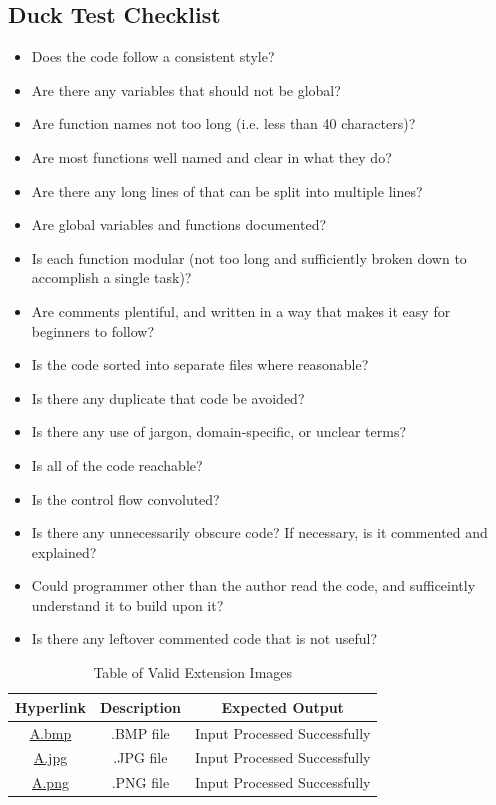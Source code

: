 \documentclass[12pt, titlepage]{article}
\begin{document}
\subsection{Duck Test Checklist} \label{checklist_duckTest}

\begin{itemize}
  \item{Does the code follow a consistent style?}
  \item{Are there any variables that should not be global?}
  \item{Are function names not too long (i.e. less than 40 characters)?}
  \item{Are most functions well named and clear in what they do?}
  \item{Are there any long lines of that can be split into multiple lines?}
  \item{Are global variables and functions documented?}
  \item{Is each function modular (not too long and sufficiently broken down to accomplish a single task)?}
  \item{Are comments plentiful, and written in a way that makes it easy for beginners to follow?}
  \item{Is the code sorted into separate files where reasonable?}
  \item{Is there any duplicate that code be avoided?}
  \item{Is there any use of jargon, domain-specific, or unclear terms?}
  \item{Is all of the code reachable?}
  \item{Is the control flow convoluted?}
  \item{Is there any unnecessarily obscure code? If necessary, is it commented and explained?}
  \item{Could programmer other than the author read the code, and sufficeintly understand it to build upon it?}
  \item{Is there any leftover commented code that is not useful?}
\end{itemize}

\begin{table}[h!]
  \centering
  \begin{tabular}{|c|c|c|}
    \hline
    \textbf{Hyperlink} & \textbf{Description} & \textbf{Expected Output} \\ \hline
    \href{https://github.com/cer-hunter/OAR-CAS741/tree/main/tests/test-images/A.bmp}{A.bmp} & .BMP file & Input Processed Successfully \\ \hline
    \href{https://github.com/cer-hunter/OAR-CAS741/tree/main/tests/test-images/A.jpg}{A.jpg} & .JPG file & Input Processed Successfully \\ \hline
    \href{https://github.com/cer-hunter/OAR-CAS741/tree/main/tests/test-images/A.png}{A.png} & .PNG file & Input Processed Successfully \\ \hline
  \end{tabular}
  \caption{Table of Valid Extension Images}
  \label{table_ext}
\end{table}
\end{document}
